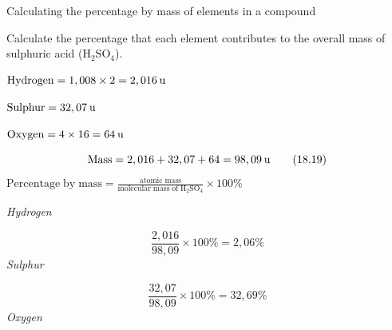 \par
            \label{m38712*secfhsst!!!underscore!!!id901}\vspace{.5cm} 
      \noindent
      \begin{wex}{Calculating the percentage by mass of elements in a compound }
{
      \label{m38712*probfhsst!!!underscore!!!id902}
      \label{m38712*id280520}Calculate the percentage that each element contributes to the overall mass of sulphuric acid (${\mathrm{H}}_{2}{\mathrm{SO}}_{4}$).\par 
      \vspace{5pt}}
{
      \label{m38712*id280575}$\mathrm{Hydrogen}=1,008\ensuremath{\times}2=2,016\phantom{\rule{2pt}{0ex}}\mathrm{u}$\par 
      \label{m38712*id280588}$\mathrm{Sulphur}=32,07\phantom{\rule{2pt}{0ex}}\mathrm{u}$\par 
      \label{m38712*id280591}$\mathrm{Oxygen}=4\ensuremath{\times}16=64\phantom{\rule{2pt}{0ex}}\mathrm{u}$\par 
      \label{m38712*id280629}\nopagebreak\noindent{}
        
    \begin{equation}
    \mathrm{Mass}=2,016+32,07+64=98,09\phantom{\rule{2pt}{0ex}}\mathrm{u}\tag{18.19}
      \end{equation}
      \label{m38712*id280688}$\mathrm{Percentage\; by\; mass}=\frac{\mathrm{atomic\; mass}}{\mathrm{molecular\; mass\; of\; H}{}_{2}\mathrm{SO}{}_{4}}\ensuremath{\times}100\%$\par 
      \label{m38712*id280729}
        \textsl{Hydrogen}
      \par 
      \label{m38712*id280735}\nopagebreak\noindent{}
        
    \begin{equation}
    \frac{2,016}{98,09}\ensuremath{\times}100\%=2,06\%\tag{18.20}
      \end{equation}
      \label{m38712*id280780}
        \textsl{Sulphur}
      \par 
      \label{m38712*id280786}\nopagebreak\noindent{}
        
    \begin{equation}
    \frac{32,07}{98,09}\ensuremath{\times}100\%=32,69\%\tag{18.21}
      \end{equation}
      \label{m38712*id280831}
        \textsl{Oxygen}
      \par 
      \label{m38712*id280837}\nopagebreak\noindent{}
        
}
\end{wex}
